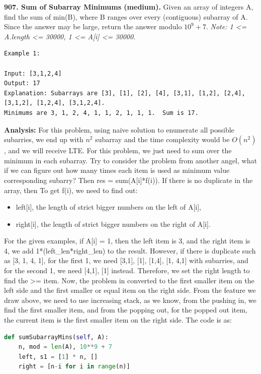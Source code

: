 \documentclass[../main.tex]{subfiles}
\begin{document}
\begin{examples}[resume]
\item \textbf{907. Sum of Subarray Minimums (medium).} Given an array of integers A, find the sum of min(B), where B ranges over every (contiguous) subarray of A. Since the answer may be large, return the answer modulo $10^9 + 7$. \textit{Note: 1 <= A.length <= 30000, 1 <= A[i] <= 30000.}
\begin{lstlisting}[numbers=none]
Example 1:

Input: [3,1,2,4]
Output: 17
Explanation: Subarrays are [3], [1], [2], [4], [3,1], [1,2], [2,4], [3,1,2], [1,2,4], [3,1,2,4]. 
Minimums are 3, 1, 2, 4, 1, 1, 2, 1, 1, 1.  Sum is 17.
\end{lstlisting}

\textbf{Analysis:} For this problem, using naive solution to enumerate all possible subarries, we end up with $n^2$ subarray and the time complexity would be $O(n^2)$, and we will receive LTE. For this problem, we just need to sum over the minimum in each subarray. Try to consider the problem from another angel, what if we can figure out how many times each item is used as minimum value corresponding subarry? Then res = sum(A[i]*f(i)). If there is no duplicate in the array, then To get f(i), we need to find out:
\begin{itemize}
    \item left[i], the length of strict bigger numbers on the left of A[i],
    \item right[i], the length of strict bigger numbers on the right of A[i].
\end{itemize}
For the given examples, if A[i] = 1, then the left item is 3, and the right item is 4, we add 1*(left\_len*right\_len) to the result. However, if there is duplicate such as [3, 1, 4, 1], for the first 1, we need [3,1], [1], [1,4], [1, 4,1] with subarries, and for the second 1, we need [4,1], [1] instead. Therefore, we set the right length to find the >= item. Now, the problem in converted to the first smaller item on the left side and the first smaller or equal item on the right side. From the feature we draw above, we need to use increasing stack, as we know, from the pushing in, we find the first smaller item, and from the popping out, for the popped out item, the current item is the first smaller item on the right side. The code is as:
\begin{lstlisting}[language=Python]
def sumSubarrayMins(self, A):
    n, mod = len(A), 10**9 + 7
    left, s1 = [1] * n, []
    right = [n-i for i in range(n)]

\end{lstlisting}
\end{examples}
\end{document}
